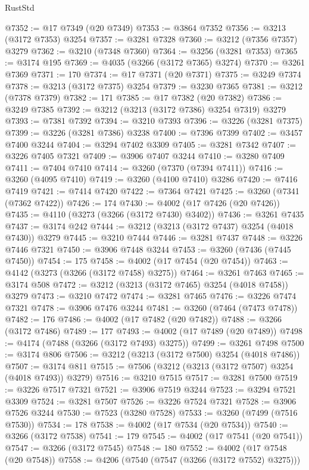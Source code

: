 \begin{lexlean}{RustStd}
\begin{coremodule}
{\begin{coremodule}
{{{{{{{{{{{{{{{{{{{{{{{{{{@7352 := @17 @7349 (@20 @7349)
@7353 := @3864 @7352
@7356 := @3213 (@3172 @7353) @3254
@7357 := @3281 @7328
@7360 := @3212 (@7356 @7357) @3279
@7362 := @3210 (@7348 @7360)
@7364 := @3256 (@3281 @7353)
@7365 := @3174 @195
@7369 := @4035 (@3266 (@3172 @7365) @3274)
@7370 := @3261 @7369
@7371 := 170
@7374 := @17 @7371 (@20 @7371)
@7375 := @3249 @7374
@7378 := @3213 (@3172 @7375) @3254
@7379 := @3230 @7365
@7381 := @3212 (@7378 @7379)
@7382 := 171
@7385 := @17 @7382 (@20 @7382)
@7386 := @3249 @7385
@7392 := @3212 (@3213 (@3172 @7386) @3254 @7319) @3279
@7393 := @7381 @7392
@7394 := @3210 @7393
@7396 := @3226 (@3281 @7375)
@7399 := @3226 (@3281 @7386) @3238
@7400 := @7396 @7399
@7402 := @3457 @7400 @3244
@7404 := @3294 @7402 @3309
@7405 := @3281 @7342
@7407 := @3226 @7405 @7321
@7409 := @3906 @7407 @3244
@7410 := @3280 @7409
@7411 := @7404 @7410
@7414 := @3260 (@7370 (@7394 @7411))
@7416 := @3260 (@4095 @7410)
@7419 := @3260 (@4100 @7410) @3286
@7420 := @7416 @7419
@7421 := @7414 @7420
@7422 := @7364 @7421
@7425 := @3260 (@7341 (@7362 @7422))
@7426 := 174
@7430 := @4002 (@17 @7426 (@20 @7426))
@7435 := @4110 (@3273 (@3266 (@3172 @7430) @3402))
@7436 := @3261 @7435
@7437 := @3174 @242
@7444 := @3212 (@3213 (@3172 @7437) @3254 (@4018 @7430)) @3279
@7445 := @3210 @7444
@7446 := @3281 @7437
@7448 := @3226 @7446 @7321
@7450 := @3906 @7448 @3244
@7453 := @3260 (@7436 (@7445 @7450))
@7454 := 175
@7458 := @4002 (@17 @7454 (@20 @7454))
@7463 := @4142 (@3273 (@3266 (@3172 @7458) @3275))
@7464 := @3261 @7463
@7465 := @3174 @508
@7472 := @3212 (@3213 (@3172 @7465) @3254 (@4018 @7458)) @3279
@7473 := @3210 @7472
@7474 := @3281 @7465
@7476 := @3226 @7474 @7321
@7478 := @3906 @7476 @3244
@7481 := @3260 (@7464 (@7473 @7478))
@7482 := 176
@7486 := @4002 (@17 @7482 (@20 @7482))
@7488 := @3266 (@3172 @7486)
@7489 := 177
@7493 := @4002 (@17 @7489 (@20 @7489))
@7498 := @4174 (@7488 (@3266 (@3172 @7493) @3275))
@7499 := @3261 @7498
@7500 := @3174 @806
@7506 := @3212 (@3213 (@3172 @7500) @3254 (@4018 @7486))
@7507 := @3174 @811
@7515 := @7506 (@3212 (@3213 (@3172 @7507) @3254 (@4018 @7493)) @3279)
@7516 := @3210 @7515
@7517 := @3281 @7500
@7519 := @3226 @7517 @7321
@7521 := @3906 @7519 @3244
@7523 := @3294 @7521 @3309
@7524 := @3281 @7507
@7526 := @3226 @7524 @7321
@7528 := @3906 @7526 @3244
@7530 := @7523 (@3280 @7528)
@7533 := @3260 (@7499 (@7516 @7530))
@7534 := 178
@7538 := @4002 (@17 @7534 (@20 @7534))
@7540 := @3266 (@3172 @7538)
@7541 := 179
@7545 := @4002 (@17 @7541 (@20 @7541))
@7547 := @3266 (@3172 @7545)
@7548 := 180
@7552 := @4002 (@17 @7548 (@20 @7548))
@7558 := @4206 (@7540 (@7547 (@3266 (@3172 @7552) @3275)))
}}}}}}}}}}}}}}}}}}}}}}}}}}
\end{coremodule}}
\end{coremodule}
\end{lexlean}
